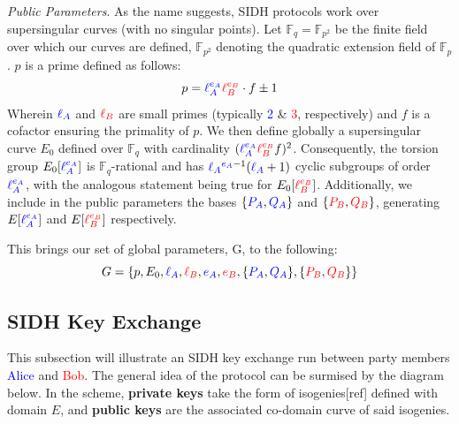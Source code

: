 \noindent
\emph{Public Parameters}. As the name suggests, SIDH protocols work over supersingular curves (with no singular points). Let $\mathbb{F}_q = \mathbb{F}_{p^2}$ be the finite field over which our curves are defined, $\mathbb{F}_{p^2}$ denoting the quadratic extension field of $\mathbb{F}_{p}$.  $p$ is a prime defined as follows:
$$
p = \textcolor{blue}{\ell_{A}^{e_A}} \textcolor{red}{\ell_{B}^{e_B}} \cdot f \pm 1
$$
Wherein $\textcolor{blue}{\ell_{A}}$ and $\textcolor{red}{\ell_{B}}$ are small primes (typically \textcolor{blue}{2} \& \textcolor{red}{3}, respectively) and $f$ is a cofactor ensuring the primality of $p$. We then define globally a supersingular curve $E_0$ defined over $\mathbb{F}_q$ with cardinality $(\textcolor{blue}{\ell_{A}^{e_A}} \textcolor{red}{\ell_{B}^{e_B}} f)^2$. Consequently, the torsion group $E_0[\textcolor{blue}{\ell_{A}^{e_A}}]$ is $\mathbb{F}_q$-rational and has $\textcolor{blue}{\ell_{A}}^{\textcolor{blue}{e_A} - 1} (\textcolor{blue}{\ell_{A}} + 1)$ cyclic subgroups of order $\textcolor{blue}{\ell_{A}^{e_A}}$, with the analogous statement being true for $E_0[\textcolor{red}{\ell_{B}^{e_B}}]$. Additionally, we include in the public parameters the bases $\{\textcolor{blue}{P_A},\textcolor{blue}{Q_A}\}$ and $\{\textcolor{red}{P_B},\textcolor{red}{Q_B}\}$, generating $E[\textcolor{blue}{\ell_{A}^{e_A}}]$ and $E[\textcolor{red}{\ell_{B}^{e_B}}]$ respectively. 

This brings our set of global parameters, G, to the following:\\
$$
G = \{p,E_0,\textcolor{blue}{\ell_{A}},\textcolor{red}{\ell_{B}},\textcolor{blue}{e_A},\textcolor{red}{e_B},\{\textcolor{blue}{P_A},\textcolor{blue}{Q_A}\},\{\textcolor{red}{P_B},\textcolor{red}{Q_B}\}\}
$$



\subsection{SIDH Key Exchange}

This subsection will illustrate an SIDH key exchange run between party members \textcolor{blue}{Alice} and \textcolor{red}{Bob}. The general idea of the protocol can be surmised by the diagram below. In the scheme, \textbf{private keys} take the form of isogenies[ref] defined with domain $E$, and \textbf{public keys} are the associated co-domain curve of said isogenies.

\begin{center}
\end{center}

